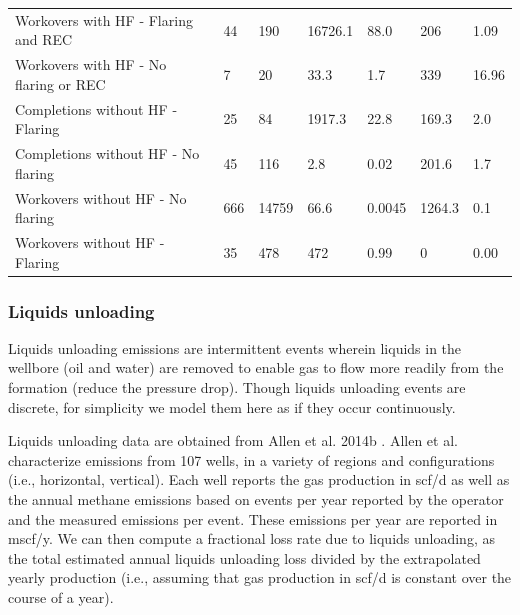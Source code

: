 \documentclass[11pt]{report}
\begin{document}
{{{{\begin{landscape}
\begin{table}
\begin{scriptsize}
\begin{tabular*}{1\columnwidth}{p{}p{}p{}p{}p{}p{}p{}}
Workovers with HF - Flaring and REC         		& 44                         & 190                       & 16726.1             & 88.0                   & 206                 & 1.09                   \\
Workovers with HF - No flaring or REC  			& 7                          & 20                        & 33.3                & 1.7                    & 339                 & 16.96   \\  
\midrule       
Completions without HF - Flaring                                & 25                         & 84                        & 1917.3              & 22.8                   & 169.3               & 2.0                    \\
Completions without HF - No flaring                            & 45                         & 116                       & 2.8                 & 0.02                   & 201.6               & 1.7                    \\
Workovers without HF - No flaring                               & 666                        & 14759                     & 66.6                & 0.0045                 & 1264.3              & 0.1                    \\
Workovers without HF - Flaring                                     & 35                         & 478                       & 472                 & 0.99                   & 0                   & 0.00                   \\
\bottomrule
\end{tabular*}
\end{scriptsize}
\end{table}
\end{landscape}



\subsubsection{Liquids unloading}

Liquids unloading emissions are intermittent events wherein liquids in the wellbore (oil and water) are removed to enable gas to flow more readily from the formation (reduce the pressure drop). Though liquids unloading events are discrete, for simplicity we model them here as if they occur continuously.

Liquids unloading data are obtained from Allen et al. 2014b \cite{Allen2014b}. Allen et al. characterize emissions from 107 wells, in a variety of regions and configurations (i.e., horizontal, vertical). Each well reports the gas production in scf/d as well as the annual methane emissions based on events per year reported by the operator and the measured emissions per event. These emissions per year are reported in mscf/y. We can then compute a fractional loss rate due to liquids unloading, as the total estimated annual liquids unloading loss divided by the extrapolated yearly production (i.e., assuming that gas production in scf/d is constant over the course of a year).

}}}}
\end{document}
